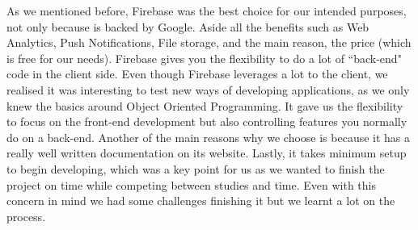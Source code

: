 As we mentioned before, Firebase was the best choice for our intended purposes, not only because is backed by Google. Aside all the benefits such as Web Analytics, Push Notifications, File storage, and the main reason, the price (which is free for our needs). Firebase gives you the flexibility to do a lot of ``back-end" code in the client side. Even though Firebase leverages a lot to the client, we realised it was interesting to test new ways of developing applications, as we only knew the basics around Object Oriented Programming. It gave us the flexibility to focus on the front-end development but also controlling features you normally do on a back-end. Another of the main reasons why we choose is because it has a really well written documentation on its website. Lastly, it takes minimum setup to begin developing, which was a key point for us as we wanted to finish the project on time while competing between studies and time. Even with this concern in mind we had some challenges finishing it but we learnt a lot on the process.
